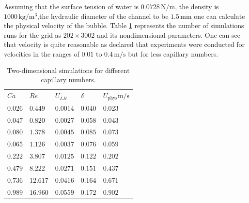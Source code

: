 \documentclass{article}
\begin{document}
Assuming that the surface tension of water is $0.0728\,\mathrm{N/m}$, the density is
$1000\,\mathrm{kg/m^3}$,the hydraulic diameter of the channel to be $1.5\,\mathrm{mm}$ one can
calculate the physical velocity of the bubble.
Table \ref{table:twod:simulations} represents the number of simulations runs for the grid as
$202\times 3002$ and its nondimensional parameters. One can see that velocity is quite reasonable
as \citet{bercic-mass} declared that experiments were conducted for velocities in the ranges of
$0.01$ to $0.4\,\mathrm{m}/\mathrm{s}$ but for less capillary numbers. 
\begin{table}
\begin{tabularx}{\textwidth}{|X|X|X|X|X|}
$Ca$&$Re$&$U_{LB}$&$\delta$&$U_{\mathrm{phys}}\mathrm{m/s}$ \\
$0.026$ &$0.449$  &$0.0014$ &$0.040$&$0.023$\\  
$0.047$ &$0.820$  &$0.0027$ &$0.058$&$0.043$\\ 
$0.080$ &$1.378$  &$0.0045$ &$0.085$&$0.073$\\
$0.065$ &$1.126$  &$0.0037$ &$0.076$&$0.059$\\
$0.222$ &$3.807$  &$0.0125$ &$0.122$&$0.202$\\  
$0.479$ &$8.222$  &$0.0271$ &$0.151$&$0.437$\\
$0.736$ &$12.617$ &$0.0416$ &$0.164$&$0.671$\\ 
$0.989$ &$16.960$ &$0.0559$ &$0.172$&$0.902$\\
\end{tabularx}\caption{Two-dimensional simulations for different
capillary numbers. \label{table:twod:simulations}}
\end{table}
\end{document}
